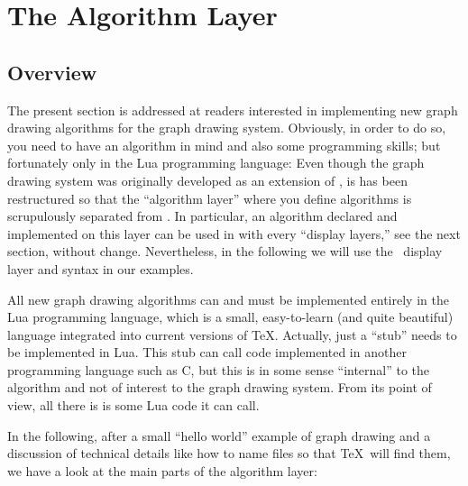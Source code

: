 %
%
%


\section{The Algorithm Layer}

\label{section-gd-algorithm-layer}



\subsection{Overview}

The present section is addressed at readers interested in implementing
new graph drawing algorithms for the graph drawing system. Obviously,
in order to do so, you need to have an algorithm in mind and also some
programming skills; but fortunately only in the Lua programming
language: Even though the graph drawing system was originally
developed as an extension of \tikzname, is has been restructured so
that the ``algorithm layer'' where you define algorithms is
scrupulously separated from \tikzname. In particular, an algorithm
declared and implemented on this layer can be used in with every ``display
layers,'' see the next section, without change. Nevertheless, in
the following we will use the \tikzname\ display layer and syntax in
our examples.

All new graph drawing algorithms can and must be implemented entirely in
the Lua programming language, which is a small, easy-to-learn (and
quite beautiful) language integrated into current versions of
\TeX. Actually, just a ``stub'' needs to be implemented in Lua. This
stub can call code implemented in another programming language such as
C, but this is in some sense ``internal'' to the algorithm and not of
interest to the graph drawing system. From its point of view, all
there is is some Lua code it can call.

In the following, after a small ``hello world'' example of graph
drawing and a discussion of technical details like
how to name files so that \TeX\ will find them, we have a look at the
main parts of the algorithm layer:

